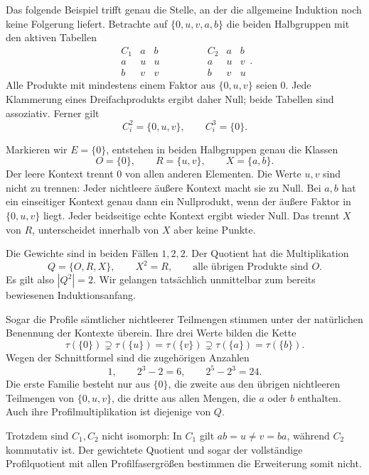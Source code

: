 \documentclass[a4paper,11pt]{article}
\begin{document}
Das folgende Beispiel trifft genau die Stelle, an der die allgemeine
Induktion noch keine Folgerung liefert. Betrachte auf
\(\{0,u,v,a,b\}\) die beiden Halbgruppen mit den aktiven Tabellen
\[
 \begin{array}{c|cc}
 C_1&a&b\\\hline
 a&u&u\\
 b&v&v
 \end{array}
 \qquad\qquad
 \begin{array}{c|cc}
 C_2&a&b\\\hline
 a&u&v\\
 b&v&u
 \end{array}.
\]
Alle Produkte mit mindestens einem Faktor aus \(\{0,u,v\}\)
seien \(0\). Jede Klammerung eines Dreifachprodukts ergibt daher
Null; beide Tabellen sind assoziativ. Ferner gilt
\[
 C_i^2=\{0,u,v\},\qquad C_i^3=\{0\}.
\]

Markieren wir \(E=\{0\}\), entstehen in beiden Halbgruppen
genau die Klassen
\begin{equation}\label{cp:example-classes}
 O=\{0\},\qquad R=\{u,v\},\qquad X=\{a,b\}.
\end{equation}
Der leere Kontext trennt \(0\) von allen anderen Elementen.
Die Werte \(u,v\) sind nicht zu trennen: Jeder nichtleere äußere
Kontext macht sie zu Null. Bei \(a,b\) hat ein einseitiger Kontext
genau dann ein Nullprodukt, wenn der äußere Faktor in
\(\{0,u,v\}\) liegt. Jeder beidseitige echte Kontext ergibt wieder
Null. Das trennt \(X\) von \(R\), unterscheidet innerhalb von \(X\)
aber keine Punkte.

Die Gewichte sind in beiden Fällen \(1,2,2\). Der Quotient hat
die Multiplikation
\[
 Q=\{O,R,X\},\qquad X^2=R,\qquad
 \text{alle übrigen Produkte sind }O.
\]
Es gilt also \(|Q^2|=2\). Wir gelangen tatsächlich unmittelbar zum
bereits bewiesenen Induktionsanfang.

Sogar die Profile sämtlicher nichtleerer Teilmengen stimmen unter
der natürlichen Benennung der Kontexte überein. Ihre drei Werte
bilden die Kette
\[
 \tau(\{0\})\supsetneq\tau(\{u\})=\tau(\{v\})
 \supsetneq\tau(\{a\})=\tau(\{b\}).
\]
Wegen der Schnittformel sind die zugehörigen Anzahlen
\[
 1,\qquad 2^3-2=6,\qquad 2^5-2^3=24.
\]
Die erste Familie besteht nur aus \(\{0\}\), die zweite aus den
übrigen nichtleeren Teilmengen von \(\{0,u,v\}\), die dritte aus
allen Mengen, die \(a\) oder \(b\) enthalten. Auch ihre
Profilmultiplikation ist diejenige von \(Q\).

Trotzdem sind \(C_1,C_2\) nicht isomorph: In \(C_1\) gilt
\(ab=u\ne v=ba\), während \(C_2\) kommutativ ist.
Der gewichtete Quotient und sogar der vollständige Profilquotient
mit allen Profilfasergrößen bestimmen die Erweiterung somit nicht.
\end{document}

